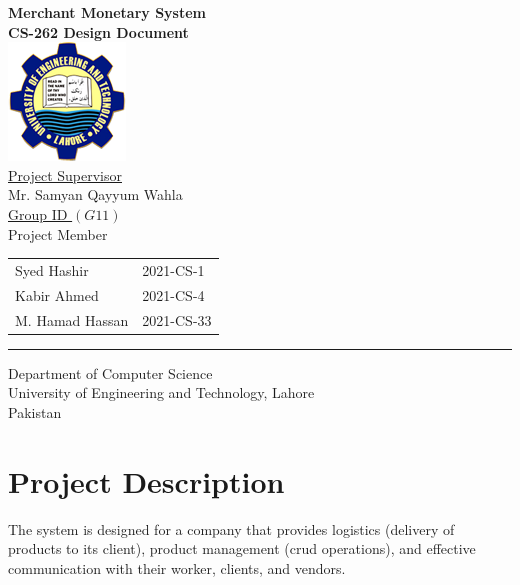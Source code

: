 \documentclass[12pt,a4paper]{report}
\begin{document}
\thispagestyle{empty}
\begin{center}
\textbf{\large{Merchant Monetary System}}\\
\vspace{0.5cm}
\textbf{ CS-262 Design Document} \\
\vspace{1.5cm}
\includegraphics[scale=.07]{UETLogo}\\
\vspace{1.5cm}
\underline{ Project Supervisor}\\
\vspace{0.5cm}
Mr. Samyan Qayyum Wahla\\
\vspace{1cm}
\underline {Group ID $(G 11)$} \\
\vspace{0.5cm}
Project Member\\
\vspace{0.5cm}
\begin{tabular}{ m{5cm} m{4cm}}
 Syed Hashir & 2021-CS-1 \\ 
 Kabir Ahmed & 2021-CS-4  \\  
 M. Hamad Hassan & 2021-CS-33
\end{tabular}
\vspace{2cm}
\par\rule{\textwidth}{0.5pt} 
Department of Computer Science\\
University of Engineering and Technology, Lahore\\
Pakistan
\end{center}
\newpage

\tableofcontents
\thispagestyle{empty}


\newpage
\setcounter{page}{1}
\chapter {Project Description}

The system is designed for a company that provides
logistics (delivery of products to its client), product management (crud operations), and effective communication with their worker, clients, and vendors.
 
\end{document}
